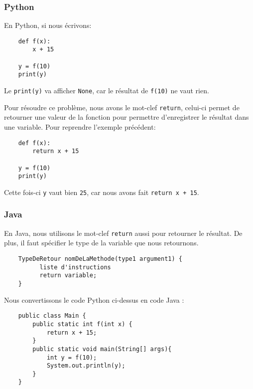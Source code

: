 \subsubsection{Python}

En Python, si nous écrivons: 

\begin{verbatim}
    def f(x):
        x + 15
        
    y = f(10)
    print(y)
\end{verbatim}
    
Le \lstinline{print(y)} va afficher \lstinline{None}, car le résultat de \lstinline{f(10)} ne vaut rien.

Pour résoudre ce problème, nous avons le mot-clef \lstinline{return}, celui-ci permet de retourner une valeur de la fonction pour permettre d'enregistrer le résultat dans une variable. Pour reprendre l'exemple précédent: 
\begin{verbatim}
    def f(x):
        return x + 15
        
    y = f(10)
    print(y)
\end{verbatim}
    
Cette fois-ci \lstinline{y} vaut bien \lstinline{25}, car nous avons fait \lstinline{return x + 15}.

\subsubsection{Java}

En Java, nous utilisons le mot-clef \lstinline{return} aussi pour retourner le résultat. De plus, il faut spécifier le type de la variable que nous retournons.

\begin{verbatim}
    TypeDeRetour nomDeLaMethode(type1 argument1) {
          liste d'instructions
          return variable;
    }
\end{verbatim}

Nous convertissons le code Python ci-dessus en code Java :

\begin{verbatim}
    public class Main {
        public static int f(int x) {
            return x + 15; 
        }
        public static void main(String[] args){
            int y = f(10);
            System.out.println(y);
        }
    }
\end{verbatim}

